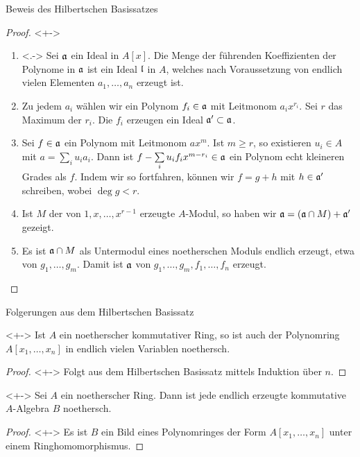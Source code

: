 \begin{frame}{Beweis des Hilbertschen Basissatzes}
	\begin{proof}<+->
		\begin{enumerate}[<+->]
		\item<.->
			Sei \(\mathfrak{a}\) ein Ideal in \(A[x]\). Die Menge der führenden Koeffizienten der
			Polynome in \(\mathfrak{a}\) ist ein Ideal \(\mathfrak{l}\) in \(A\), welches
			nach Voraussetzung von endlich vielen Elementen \(a_1, \dotsc, a_n\) erzeugt ist.
		\item
			Zu jedem \(a_i\) wählen wir ein Polynom \(f_i \in \mathfrak{a}\) mit Leitmonom
			\(a_i x^{r_i}\). Sei \(r\) das Maximum der \(r_i\). Die \(f_i\)
			erzeugen ein Ideal \(\mathfrak{a}' \subset \mathfrak{a}\).
		\item
			Sei \(f \in \mathfrak{a}\) ein Polynom mit Leitmonom \(a x^m\).
			Ist \(m \ge r\), so existieren \(u_i \in A\) mit \(a = \sum\limits_i u_i a_i\).
			Dann ist \(f - \sum\limits_i u_i f_i x^{m - r_i} \in \mathfrak{a}\) ein Polynom echt kleineren Grades 
			als \(f\). Indem wir so fortfahren, können wir \(f = g + h\) mit \(h \in \mathfrak{a}'\)
			schreiben, wobei \(\deg g < r\).
		\item
			Ist \(M\) der von \(1, x, \dots, x^{r - 1}\) erzeugte \(A\)-Modul, so haben
			wir \(\mathfrak{a} = (\mathfrak{a} \cap M) + \mathfrak{a}'\) gezeigt.
		\item
			Es ist \(\mathfrak{a} \cap M\) als Untermodul eines noetherschen Moduls endlich erzeugt, 
			etwa von \(g_1, \dotsc, g_m\). Damit ist \(\mathfrak{a}\) von
			\(g_1, \dotsc, g_m, f_1, \dotsc, f_n\) erzeugt.
			\qedhere
		\end{enumerate}
	\end{proof}
\end{frame}

\begin{frame}{Folgerungen aus dem Hilbertschen Basissatz}
	\begin{corollary}<+->
		Ist \(A\) ein noetherscher kommutativer Ring, so ist auch der Polynomring \(A[x_1, \dotsc, x_n]\) in
		endlich vielen Variablen noethersch.
	\end{corollary}
	\begin{proof}<+->
		Folgt aus dem Hilbertschen Basissatz mittels Induktion über \(n\).
	\end{proof}
	\begin{corollary}<+->
		Sei \(A\) ein noetherscher Ring. Dann ist jede endlich erzeugte kommutative
		\(A\)-Algebra \(B\) noethersch.
	\end{corollary}
	\begin{proof}<+->
		Es ist \(B\) ein Bild eines Polynomringes der Form \(A[x_1, \dotsc, x_n]\) unter einem
		Ringhomomorphismus.
	\end{proof}
\end{frame}

